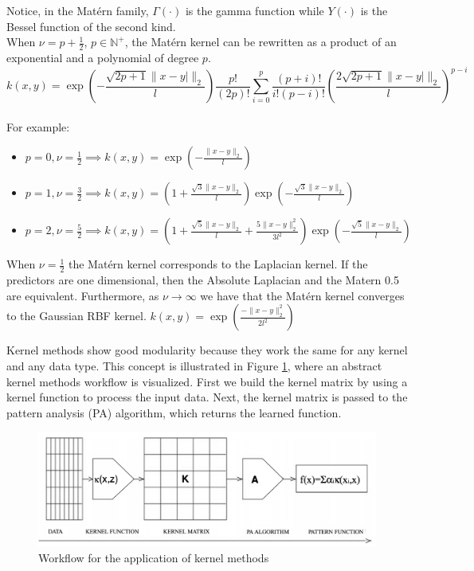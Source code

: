 Notice, in the Matérn family, $\Gamma(\cdot)$ is the gamma function while $Y(\cdot)$ is the Bessel function of the second kind.
\\
When $\nu=p+\frac{1}{2}$, $p \in \mathbb{N}^+$, the Matérn kernel can be rewritten as a product of an exponential and a polynomial of degree $p$. 
\\
$$k(x,y)=\exp \left(-{\frac {{\sqrt {2p+1}}\|x-y|\|_{2}}{l }}\right){\frac {p!}{(2p)!}}\sum\limits_{i=0}^{p}{\frac {(p+i)!}{i!(p-i)!}}\left({\frac {2{\sqrt {2p+1}}\|x-y|\|_{2}}{l }}\right)^{p-i}$$
\\
For example:
\begin{itemize}
    \item $p=0,\nu=\frac{1}{2} \implies k(x,y)=\exp\left(-\frac{\|x-y\|_{2}}{l}\right)$
    \item $p=1,\nu=\frac{3}{2} \implies 
    k(x,y)=\left(1+{\frac {{\sqrt {3}}\|x-y\|_{2}}{l }}\right)\exp \left(-{\frac {{\sqrt {3}}\|x-y\|_{2}}{l }}\right)$
    \item $p=2,\nu=\frac{5}{2} \implies k(x,y)=\left(1+{\frac {{\sqrt {5}}\|x-y\|_{2}}{l }}+{\frac {5\|x-y\|_{2}^{2}}{3 l ^{2}}}\right)\exp \left(-{\frac {{\sqrt {5}}\|x-y\|_{2}}{l }}\right)$
\end{itemize}

When $\nu=\frac{1}{2}$ the Matérn kernel corresponds to the Laplacian kernel. If the predictors are one dimensional, then the Absolute Laplacian and the Matern 0.5 are equivalent. %
Furthermore, as $\nu \to \infty$ we have that the Matérn kernel converges to the Gaussian RBF kernel.
$k(x,y)=\exp\left(\frac{-\|x-y\|_{2}^2}{2l^2}\right)$




Kernel methods show good modularity because they work the same for any kernel and any data type. This concept is illustrated in Figure \ref{fig:workflow_kernels}, where an abstract kernel methods workflow is visualized. First we build the kernel matrix by using a kernel function to process the input data. Next, the kernel matrix is passed to the pattern analysis (PA) algorithm, which returns the learned function.

\begin{figure}[!ht]
    \includegraphics[width=\textwidth]{images/workflow_kernels.png}
    \caption{Workflow for the application of kernel methods \cite{shawe2004kernel}}
    \label{fig:workflow_kernels}
\end{figure}